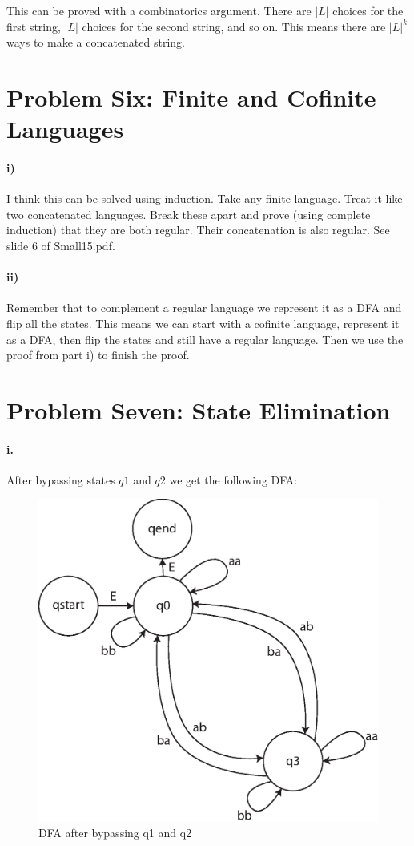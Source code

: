 \documentclass[10pt,letter]{article}
\begin{document}
This can be proved with a combinatorics argument. There are $|L|$ choices for the first string, $|L|$ choices for the second string, and so on. This means there are $|L|^k$ ways to make a concatenated string. 

\section*{Problem Six: Finite and Cofinite Languages}

\paragraph{i)} I think this can be solved using induction. Take any finite language. Treat it like two concatenated languages. Break these apart and prove (using complete induction) that they are both regular. Their concatenation is also regular. See slide 6 of Small15.pdf.

\paragraph{ii)} Remember that to complement a regular language we represent it as a DFA and flip all the states. This means we can start with a cofinite language, represent it as a DFA, then flip the states and still have a regular language. Then we use the proof from part i) to finish the proof.

\section*{Problem Seven: State Elimination}

\paragraph{i.} After bypassing states $q1$ and $q2$ we get the following DFA:\\

\begin{figure}[h]
\centering
  \includegraphics[width=0.45\linewidth]{7i.eps}
  \caption{DFA after bypassing q1 and q2}
  \label{fig:7i}
\end{figure}
\end{document}
